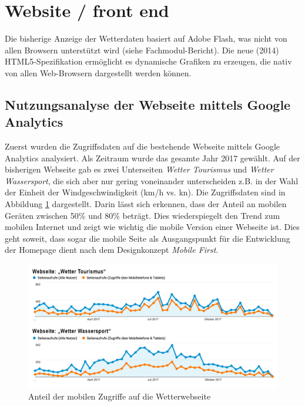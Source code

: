 \section{Website / front end}
\newline

Die bisherige Anzeige der Wetterdaten basiert auf Adobe Flash, was nicht von allen Browsern unterstützt wird (siehe Fachmodul-Bericht). Die neue (2014) HTML5-Spezifikation ermöglicht es dynamische Grafiken zu erzeugen, die nativ von allen Web-Browsern dargestellt werden können.

\subsection{Nutzungsanalyse der Webseite mittels Google Analytics}
Zuerst wurden die Zugriffsdaten auf die bestehende Webseite mittels Google Analytics analysiert. Als Zeitraum wurde das gesamte Jahr 2017 gewählt. Auf der bisherigen Webseite gab es zwei Unterseiten \textit{Wetter Tourismus} und \textit{Wetter Wassersport}, die sich aber nur gering voneinander unterscheiden z.B. in der Wahl der Einheit der Windgeschwindigkeit (km/h vs. kn). Die Zugriffsdaten sind in Abbildung \ref{img:google_mobile} dargestellt. Darin lässt sich erkennen, dass der Anteil an mobilen Geräten zwischen 50\% und 80\% beträgt. Dies wiederspiegelt den Trend zum mobilen Internet und zeigt wie wichtig die mobile Version einer Webseite ist. Dies geht soweit, dass sogar die mobile Seite als Ausgangspunkt für die Entwicklung der Homepage dient nach dem Designkonzept \textit{Mobile First}.

\begin{figure}[h!]
	\centering
	\includegraphics[width=1\linewidth]{img/google_mobile}
	\caption{Anteil der mobilen Zugriffe auf die Wetterwebseite}
	\label{img:google_mobile}
\end{figure}

